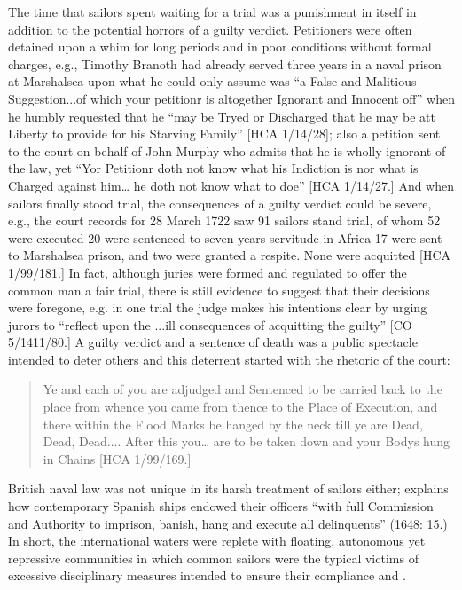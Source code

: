 The time that sailors spent waiting for a trial was a punishment in itself in addition to the potential horrors of a guilty verdict. Petitioners were often detained upon a whim for long periods and in poor conditions without formal charges, e.g., Timothy Branoth had already served three years in a naval prison at Marshalsea upon what he could only assume was “a False and Malitious Suggestion...of which your petitionr is altogether Ignorant and Innocent off” when he humbly requested that he “may be Tryed or Discharged that he may be att Liberty to provide for his Starving Family” [HCA 1/14/28]; also a petition sent to the court on behalf of John Murphy who admits that he is wholly ignorant of the law, yet “Yor Petitionr doth not know what his Indiction is nor what is Charged against him… he doth not know what to doe” [HCA 1/14/27.] And when sailors finally stood trial, the consequences of a guilty verdict could be severe, e.g., the court records for 28 {March 1722} saw 91 sailors stand trial, of whom 52 were executed 20 were sentenced to seven-years servitude in Africa 17 were sent to Marshalsea prison, and two were granted a respite. None were acquitted [HCA 1/99/181.] In fact, although juries were formed and regulated to offer the common man a fair trial, there is still evidence to suggest that their decisions were foregone, e.g. in one trial the judge makes his intentions clear by urging jurors to “reflect upon the ...ill consequences of acquitting the guilty” [CO 5/1411/80.] A guilty verdict and a sentence of death was a public spectacle intended to deter others and this deterrent started with the rhetoric of the court: 

\begin{quotation}
Ye and each of you are adjudged and Sentenced to be carried back to the place from whence you came from thence to the Place of Execution, and there within the Flood Marks be hanged by the neck till ye are Dead, Dead, Dead.... After this you… are to be taken down and your Bodys hung in Chains [HCA 1/99/169.] 
\end{quotation}

British naval law was not unique in its harsh treatment of sailors either; \citeauthor{Gage1648} explains how contemporary Spanish ships endowed their officers “with full Commission and Authority to imprison, banish, hang and execute all delinquents” (1648: 15.) In short, the international waters were replete with floating, autonomous yet repressive communities in which common sailors were the typical victims of excessive disciplinary measures intended to ensure their compliance and . 

